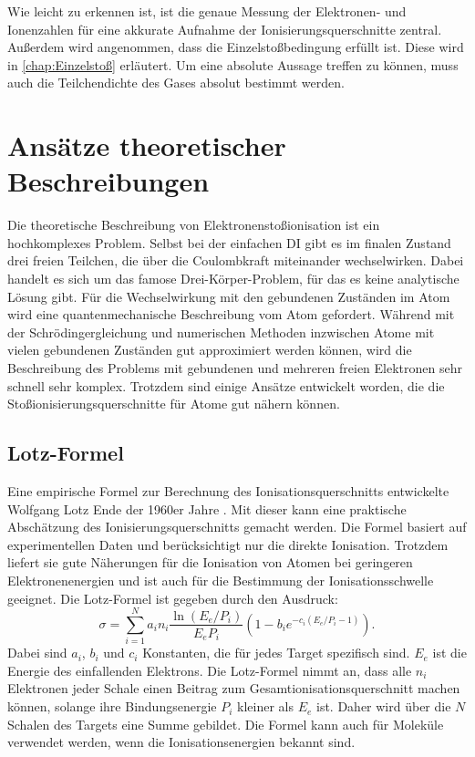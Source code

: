 Wie leicht zu erkennen ist, ist die genaue Messung der Elektronen- und Ionenzahlen für eine akkurate Aufnahme der Ionisierungsquerschnitte zentral. Außerdem wird angenommen, dass die Einzelstoßbedingung erfüllt ist. Diese wird in \ref{chap:Einzelstoß} erläutert. Um eine absolute Aussage treffen zu können, muss auch die Teilchendichte des Gases absolut bestimmt werden.


\section{Ansätze theoretischer Beschreibungen}
Die theoretische Beschreibung von Elektronenstoßionisation ist ein hochkomplexes Problem. Selbst bei der einfachen DI gibt es im finalen Zustand drei freien Teilchen, die über die Coulombkraft miteinander wechselwirken. Dabei handelt es sich um das famose Drei-Körper-Problem, für das es keine analytische Lösung gibt. Für die Wechselwirkung mit den gebundenen Zuständen im Atom wird eine quantenmechanische Beschreibung vom Atom gefordert. Während mit der Schrödingergleichung und numerischen Methoden inzwischen Atome mit vielen gebundenen Zuständen gut approximiert werden können, wird die Beschreibung des Problems mit gebundenen und mehreren freien Elektronen sehr schnell sehr komplex. Trotzdem sind einige Ansätze entwickelt worden, die die Stoßionisierungsquerschnitte für Atome gut nähern können.

\subsection{Lotz-Formel}
Eine empirische Formel zur Berechnung des Ionisationsquerschnitts entwickelte Wolfgang Lotz Ende der 1960er Jahre \cite{Lotz}. Mit dieser kann eine praktische Abschätzung des Ionisierungsquerschnitts gemacht werden. Die Formel basiert auf experimentellen Daten und berücksichtigt nur die direkte Ionisation. Trotzdem liefert sie gute Näherungen für die Ionisation von Atomen bei geringeren Elektronenenergien und ist auch für die Bestimmung der Ionisationsschwelle geeignet. Die Lotz-Formel ist gegeben durch den Ausdruck:
\begin{equation}
    \sigma = \sum_{i=1}^{N} a_i n_i \frac{ \ln (E_e / P_i) }{E_e P_i} \left( 1 - b_i e ^{-c_i (E_e / P_i-1)}\right).
\end{equation}
Dabei sind $a_i$, $b_i$ und $c_i$ Konstanten, die für jedes Target spezifisch sind. $E_e$ ist die Energie des einfallenden Elektrons. Die Lotz-Formel nimmt an, dass alle $n_i$ Elektronen jeder Schale einen Beitrag zum Gesamtionisationsquerschnitt machen können, solange ihre Bindungsenergie $P_i$ kleiner als $E_e$ ist. Daher wird über die $N$ Schalen des Targets eine Summe gebildet. Die Formel kann auch für Moleküle verwendet werden, wenn die Ionisationsenergien bekannt sind.

